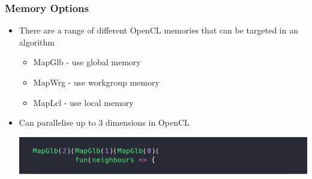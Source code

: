 \documentclass[10pt]{beamer}
\begin{document}
\begin{frame}
\frametitle{Memory Options}
\begin{itemize}
    \item There are a range of different OpenCL memories that can be targeted in an algorithm 
        \begin{itemize}
            \item MapGlb - use global memory
            \item MapWrg - use workgroup memory
            \item MapLcl - use local memory
        \end{itemize}
    \item Can parallelise up to 3 dimensions in OpenCL 
        \vspace{-.5cm}
    \begin{block}{}
        \begin{center}
            \includegraphics[width=.85\textwidth]{../images/mapMapMap.png}
        \end{center}
    \end{block}
\end{itemize}

\end{frame}
\end{document}
